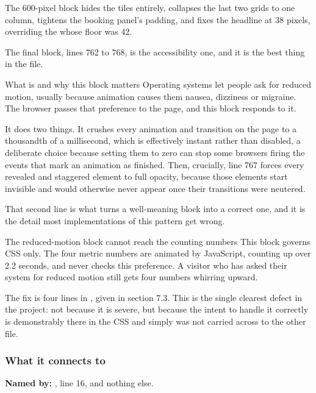 The 600-pixel block hides the tiles entirely, collapses the last two grids to one
column, tightens the booking panel's padding, and fixes the headline at 38 pixels,
overriding the  whose floor was 42.

The final block, lines 762 to 768, is the accessibility one, and it is the best
thing in the file.

\begin{keyidea}{What  is and why this block matters}
Operating systems let people ask for reduced motion, usually because animation
causes them nausea, dizziness or migraine. The browser passes that preference to
the page, and this block responds to it.

It does two things. It crushes every animation and transition on the page to a
thousandth of a millisecond, which is effectively instant rather than disabled, a
deliberate choice because setting them to zero can stop some browsers firing the
events that mark an animation as finished. Then, crucially, line 767 forces every
revealed and staggered element to full opacity, because those elements start
invisible and would otherwise never appear once their transitions were neutered.

That second line is what turns a well-meaning block into a correct one, and it is
the detail most implementations of this pattern get wrong.
\end{keyidea}

\begin{honest}{The reduced-motion block cannot reach the counting numbers}
This block governs CSS only. The four metric numbers are animated by JavaScript,
counting up over 2.2 seconds, and  never checks this preference. A
visitor who has asked their system for reduced motion still gets four numbers
whirring upward.

The fix is four lines in , given in section 7.3. This is the single
clearest defect in the project: not because it is severe, but because the intent to
handle it correctly is demonstrably there in the CSS and simply was not carried
across to the other file.
\end{honest}

\subsubsection*{What it connects to}

\textbf{Named by:} , line 16, and nothing
else.

